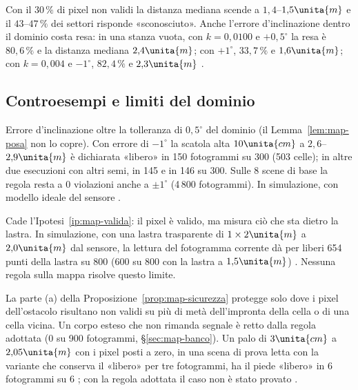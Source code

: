 Con il $30\,\%$ di pixel non validi la distanza mediana scende a $1{,}4$–$1{,}5\unita{m}$ e il $43$–$47\,\%$ dei settori risponde «sconosciuto». Anche l'errore d'inclinazione dentro il dominio costa resa: in una stanza vuota, con $k=0{,}0100$ e $+0{,}5^\circ$ la resa è $80{,}6\,\%$ e la distanza mediana $2{,}4\unita{m}$; con $+1^\circ$, $33{,}7\,\%$ e $1{,}6\unita{m}$; con $k=0{,}004$ e $-1^\circ$, $82{,}4\,\%$ e $2{,}3\unita{m}$ .

\subsection{Controesempi e limiti del dominio}\label{sec:map-controesempi}

\begin{controesempio}\label{cex:map-inclinazione}
Errore d'inclinazione oltre la tolleranza di $0{,}5^\circ$ del dominio (il Lemma~\ref{lem:map-posa} non lo copre). Con errore di $-1^\circ$ la scatola alta $10\unita{cm}$ a $2{,}6$–$2{,}9\unita{m}$ è dichiarata «libero» in 150 fotogrammi su 300 (503 celle); in altre due esecuzioni con altri semi, in 145 e in 146 su 300. Sulle 8 scene di base la regola resta a 0 violazioni anche a $\pm1^\circ$ (4\,800 fotogrammi). In simulazione, con modello ideale del sensore .
\end{controesempio}

\begin{controesempio}\label{cex:map-vetro}
Cade l'Ipotesi~\ref{ip:map-valida}: il pixel è valido, ma misura ciò che sta dietro la lastra. In simulazione, con una lastra trasparente di $1\times2\unita{m}$ a $2{,}0\unita{m}$ dal sensore, la lettura del fotogramma corrente dà per liberi 654 punti della lastra su 800 (600 su 800 con la lastra a $1{,}5\unita{m}$) . Nessuna regola sulla mappa risolve questo limite.
\end{controesempio}

\begin{controesempio}\label{cex:map-muto}
La parte (a) della Proposizione~\ref{prop:map-sicurezza} protegge solo dove i pixel dell'ostacolo risultano non validi su più di metà dell'impronta della cella o di una cella vicina. Un corpo esteso che non rimanda segnale è retto dalla regola adottata (0 su 900 fotogrammi, \S\ref{sec:map-banco}). Un palo di $3\unita{cm}$ a $2{,}05\unita{m}$ con i pixel posti a zero, in una scena di prova letta con la variante che conserva il «libero» per tre fotogrammi, ha il piede «libero» in 6 fotogrammi su 6 ; con la regola adottata il caso non è stato provato .
\end{controesempio}

